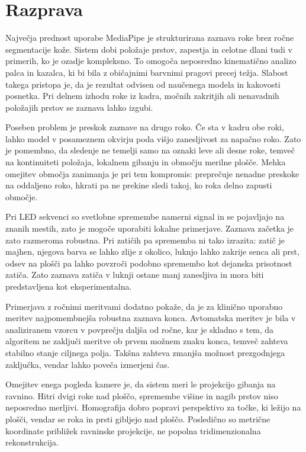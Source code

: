 \documentclass[journal,a4paper,twoside]{sty/IEEEtran}
\begin{document}
\section{Razprava}

Največja prednost uporabe MediaPipe je strukturirana zaznava roke brez ročne segmentacije kože. Sistem dobi položaje prstov, zapestja in celotne dlani tudi v primerih, ko je ozadje kompleksno. To omogoča neposredno kinematično analizo palca in kazalca, ki bi bila z običajnimi barvnimi pragovi precej težja. Slabost takega pristopa je, da je rezultat odvisen od naučenega modela in kakovosti posnetka. Pri delnem izhodu roke iz kadra, močnih zakritjih ali nenavadnih položajih prstov se zaznava lahko izgubi.

Poseben problem je preskok zaznave na drugo roko. Če sta v kadru obe roki, lahko model v posameznem okvirju poda višjo zanesljivost za napačno roko. Zato je pomembno, da sledenje ne temelji samo na oznaki leve ali desne roke, temveč na kontinuiteti položaja, lokalnem gibanju in območju merilne plošče. Mehka omejitev območja zanimanja je pri tem kompromis: preprečuje nenadne preskoke na oddaljeno roko, hkrati pa ne prekine sledi takoj, ko roka delno zapusti območje.

Pri LED sekvenci so svetlobne spremembe namerni signal in se pojavljajo na znanih mestih, zato je mogoče uporabiti lokalne primerjave. Zaznava začetka je zato razmeroma robustna. Pri zatičih pa sprememba ni tako izrazita: zatič je majhen, njegova barva se lahko zlije z okolico, luknjo lahko zakrije senca ali prst, odsev na plošči pa lahko povzroči podobno spremembo kot dejanska prisotnost zatiča. Zato zaznava zatiča v luknji ostane manj zanesljiva in mora biti predstavljena kot eksperimentalna.

Primerjava z ročnimi meritvami dodatno pokaže, da je za klinično uporabno meritev najpomembnejša robustna zaznava konca. Avtomatska meritev je bila v analiziranem vzorcu v povprečju daljša od ročne, kar je skladno s tem, da algoritem ne zaključi meritve ob prvem možnem znaku konca, temveč zahteva stabilno stanje ciljnega polja. Takšna zahteva zmanjša možnost prezgodnjega zaključka, vendar lahko poveča izmerjeni čas.

Omejitev enega pogleda kamere je, da sistem meri le projekcijo gibanja na ravnino. Hitri dvigi roke nad ploščo, spremembe višine in nagib prstov niso neposredno merljivi. Homografija dobro popravi perspektivo za točke, ki ležijo na plošči, vendar se roka in prsti gibljejo nad ploščo. Posledično so metrične koordinate približek ravninske projekcije, ne popolna tridimenzionalna rekonstrukcija.
\end{document}
